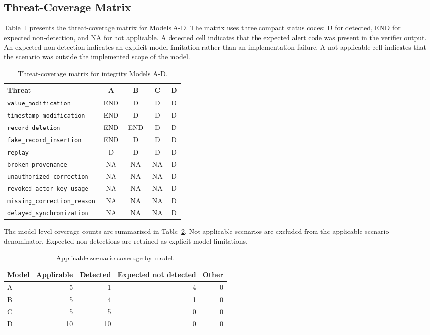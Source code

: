 \subsection{Threat-Coverage Matrix}

Table~\ref{tab:threat-coverage} presents the threat-coverage matrix for Models A-D. The matrix uses three compact status codes: D for detected, END for expected non-detection, and NA for not applicable. A detected cell indicates that the expected alert code was present in the verifier output. An expected non-detection indicates an explicit model limitation rather than an implementation failure. A not-applicable cell indicates that the scenario was outside the implemented scope of the model.

\begin{table}[htbp]
\centering
\caption{Threat-coverage matrix for integrity Models A-D.}
\label{tab:threat-coverage}
\small
\begin{tabular}{p{0.42\linewidth}cccc}
\toprule
Threat & A & B & C & D \\
\midrule
\texttt{value\_modification} & END & D & D & D \\
\texttt{timestamp\_modification} & END & D & D & D \\
\texttt{record\_deletion} & END & END & D & D \\
\texttt{fake\_record\_insertion} & END & D & D & D \\
\texttt{replay} & D & D & D & D \\
\texttt{broken\_provenance} & NA & NA & NA & D \\
\texttt{unauthorized\_correction} & NA & NA & NA & D \\
\texttt{revoked\_actor\_key\_usage} & NA & NA & NA & D \\
\texttt{missing\_correction\_reason} & NA & NA & NA & D \\
\texttt{delayed\_synchronization} & NA & NA & NA & D \\
\bottomrule
\end{tabular}
\end{table}

The model-level coverage counts are summarized in Table~\ref{tab:applicable-coverage}. Not-applicable scenarios are excluded from the applicable-scenario denominator. Expected non-detections are retained as explicit model limitations.

\begin{table}[htbp]
\centering
\caption{Applicable scenario coverage by model.}
\label{tab:applicable-coverage}
\begin{tabular}{lrrrr}
\toprule
Model & Applicable & Detected & Expected not detected & Other \\
\midrule
A & 5 & 1 & 4 & 0 \\
B & 5 & 4 & 1 & 0 \\
C & 5 & 5 & 0 & 0 \\
D & 10 & 10 & 0 & 0 \\
\bottomrule
\end{tabular}
\end{table}

